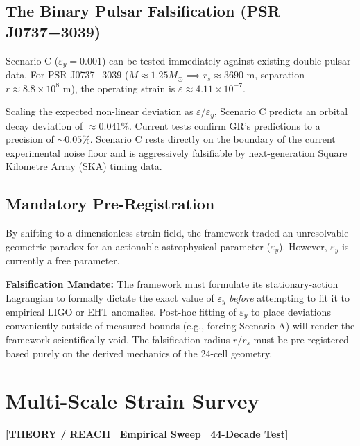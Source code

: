 \documentclass[11pt, letterpaper, openany]{book}
\begin{document}
\section{The Binary Pulsar Falsification (PSR J0737−3039)}

Scenario C ($\varepsilon_y = 0.001$) can be tested immediately against existing double pulsar data. For PSR J0737−3039 ($M \approx 1.25 M_\odot \implies r_s \approx 3690$ m, separation $r \approx 8.8 \times 10^8$ m), the operating strain is $\varepsilon \approx 4.11 \times 10^{-7}$. 

Scaling the expected non-linear deviation as $\varepsilon / \varepsilon_y$, Scenario C predicts an orbital decay deviation of $\approx 0.041\%$. Current tests confirm GR's predictions to a precision of $\sim 0.05\%$. Scenario C rests directly on the boundary of the current experimental noise floor and is aggressively falsifiable by next-generation Square Kilometre Array (SKA) timing data.

\section{Mandatory Pre-Registration}

By shifting to a dimensionless strain field, the framework traded an unresolvable geometric paradox for an actionable astrophysical parameter ($\varepsilon_y$). However, $\varepsilon_y$ is currently a free parameter.

\textbf{Falsification Mandate:} The framework must formulate its stationary-action Lagrangian to formally dictate the exact value of $\varepsilon_y$ \textit{before} attempting to fit it to empirical LIGO or EHT anomalies. Post-hoc fitting of $\varepsilon_y$ to place deviations conveniently outside of measured bounds (e.g., forcing Scenario A) will render the framework scientifically void. The falsification radius $r/r_s$ must be pre-registered based purely on the derived mechanics of the 24-cell geometry.

\chapter{Multi-Scale Strain Survey}

\begin{center}
{\color{theorytag}\textbf{[THEORY / REACH \textbullet\ Empirical Sweep \textbullet\ 44-Decade Test]}}
\end{center}
\end{document}
